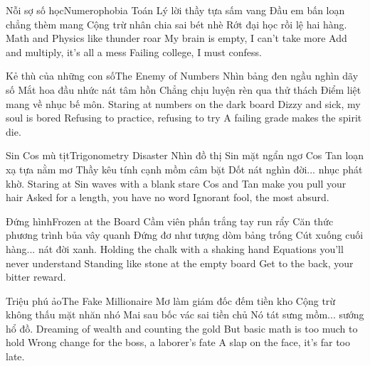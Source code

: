 \begin{tutuyetbox}{Nỗi sợ số học}{Numerophobia}
Toán Lý lời thầy tựa sấm vang
Đầu em bấn loạn chẳng thèm mang
Cộng trừ nhân chia sai bét nhè
Rớt đại học rồi lệ hai hàng.
\tcblower
Math and Physics like thunder roar 
My brain is empty, I can't take more 
Add and multiply, it's all a mess 
Failing college, I must confess.
\end{tutuyetbox}

\begin{tutuyetbox}{Kẻ thù của những con số}{The Enemy of Numbers}
Nhìn bảng đen ngầu nghìn dãy số
Mắt hoa đầu nhức nát tâm hồn
Chẳng chịu luyện rèn qua thử thách
Điểm liệt mang về nhục bế môn.
\tcblower
Staring at numbers on the dark board 
Dizzy and sick, my soul is bored 
Refusing to practice, refusing to try 
A failing grade makes the spirit die.
\end{tutuyetbox}

\begin{tutuyetbox}{Sin Cos mù tịt}{Trigonometry Disaster}
Nhìn đồ thị Sin mặt ngẩn ngơ
Cos Tan loạn xạ tựa nằm mơ
Thầy kêu tính cạnh mồm câm bặt
Dốt nát nghìn đời... nhục phát khờ.
\tcblower
Staring at Sin waves with a blank stare
Cos and Tan make you pull your hair
Asked for a length, you have no word
Ignorant fool, the most absurd.
\end{tutuyetbox}

\begin{tutuyetbox}{Đứng hình}{Frozen at the Board}
Cầm viên phấn trắng tay run rẩy
Căn thức phương trình bủa vây quanh
Đứng đơ như tượng dòm bảng trống
Cút xuống cuối hàng... nát đời xanh.
\tcblower
Holding the chalk with a shaking hand
Equations you'll never understand
Standing like stone at the empty board
Get to the back, your bitter reward.
\end{tutuyetbox}

\begin{tutuyetbox}{Triệu phú ảo}{The Fake Millionaire}
Mơ làm giám đốc đếm tiền kho
Cộng trừ không thấu mặt nhăn nhó
Mai sau bốc vác sai tiền chủ
Nó tát sưng mồm... sướng hổ đồ.
\tcblower
Dreaming of wealth and counting the gold
But basic math is too much to hold
Wrong change for the boss, a laborer's fate
A slap on the face, it's far too late.
\end{tutuyetbox}

